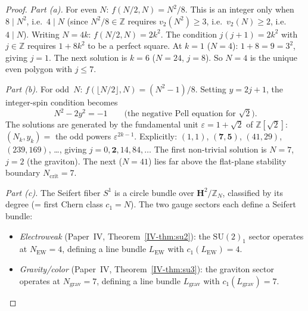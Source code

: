 \begin{proof}
\emph{Part (a).}
For even $N$: $f(N/2, N) = N^2/8$.
This is an integer only when $8 \mid N^2$, i.e.\ $4 \mid N$
(since $N^2/8 \in \mathbb{Z}$ requires $v_2(N^2) \ge 3$,
i.e.\ $v_2(N) \ge 2$, i.e.\ $4 \mid N$).
Writing $N = 4k$: $f(N/2, N) = 2k^2$.
The condition $j(j{+}1) = 2k^2$ with $j \in \mathbb{Z}$
requires $1 + 8k^2$ to be a perfect square.
At $k = 1$ ($N = 4$): $1 + 8 = 9 = 3^2$, giving $j = 1$.
The next solution is $k = 6$ ($N = 24$, $j = 8$).
So $N = 4$ is the unique even polygon with $j \le 7$.

\emph{Part (b).}
For odd~$N$: $f(\lfloor N/2 \rfloor, N) = (N^2{-}1)/8$.
Setting $y = 2j{+}1$, the integer-spin condition becomes
\begin{equation}\label{eq:pell}
  N^2 - 2y^2 = -1
  \qquad \text{(the negative Pell equation for $\sqrt{2}$)}.
\end{equation}
The solutions are generated by the fundamental unit
$\varepsilon = 1 + \sqrt{2}$ of $\mathbb{Z}[\sqrt{2}]$:
$(N_k, y_k) = $ the odd powers $\varepsilon^{2k-1}$.
Explicitly: $(1, 1)$, $\mathbf{(7, 5)}$, $(41, 29)$, $(239, 169)$, \ldots,
giving $j = 0, \mathbf{2}, 14, 84, \ldots$
The first non-trivial solution is $N = 7$, $j = 2$ (the graviton).
The next ($N = 41$) lies far above the flat-plane stability boundary
$N_{\mathrm{crit}} = 7$.

\emph{Part (c).}
The Seifert fiber $S^1$ is a circle bundle over $\mathbf{H}^2/\mathbb{Z}_N$,
classified by its degree (= first Chern class $c_1 = N$).
The two gauge sectors each define a Seifert bundle:
\begin{itemize}
\item \emph{Electroweak} (Paper~IV, Theorem~\ref*{IV-thm:su2}):
  the $\mathrm{SU}(2)_1$ sector operates at
  $N_{\mathrm{EW}} = 4$, defining a line bundle $L_{\mathrm{EW}}$
  with $c_1(L_{\mathrm{EW}}) = 4$.
\item \emph{Gravity/color} (Paper~IV, Theorem~\ref*{IV-thm:su3}):
  the graviton sector operates at
  $N_{\mathrm{grav}} = 7$, defining a line bundle $L_{\mathrm{grav}}$
  with $c_1(L_{\mathrm{grav}}) = 7$.
\end{itemize}

\end{proof}
